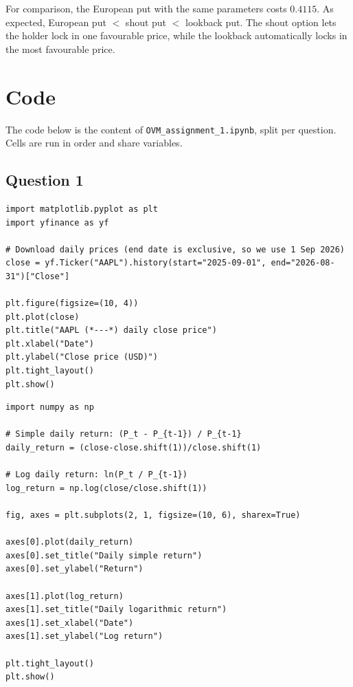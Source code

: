 \documentclass[11pt,a4paper]{article}
\begin{document}
For comparison, the European put with the same parameters costs $0.4115$. As expected,
European put $<$ shout put $<$ lookback put. The shout option lets the holder lock in one
favourable price, while the lookback automatically locks in the most favourable price.

\appendix
\section{Code}
\label{app:code}

The code below is the content of \texttt{OVM\_assignment\_1.ipynb}, split per question.
Cells are run in order and share variables.

\subsection{Question 1}

\begin{lstlisting}[caption={Q1a: download and plot the daily close prices.}, label={lst:q1a-price}]
import matplotlib.pyplot as plt
import yfinance as yf

# Download daily prices (end date is exclusive, so we use 1 Sep 2026)
close = yf.Ticker("AAPL").history(start="2025-09-01", end="2026-08-31")["Close"]

plt.figure(figsize=(10, 4))
plt.plot(close)
plt.title("AAPL (*---*) daily close price")
plt.xlabel("Date")
plt.ylabel("Close price (USD)")
plt.tight_layout()
plt.show()
\end{lstlisting}

\begin{lstlisting}[caption={Q1a: daily simple and logarithmic returns.}, label={lst:q1a-returns}]
import numpy as np

# Simple daily return: (P_t - P_{t-1}) / P_{t-1}
daily_return = (close-close.shift(1))/close.shift(1)

# Log daily return: ln(P_t / P_{t-1})
log_return = np.log(close/close.shift(1))

fig, axes = plt.subplots(2, 1, figsize=(10, 6), sharex=True)

axes[0].plot(daily_return)
axes[0].set_title("Daily simple return")
axes[0].set_ylabel("Return")

axes[1].plot(log_return)
axes[1].set_title("Daily logarithmic return")
axes[1].set_xlabel("Date")
axes[1].set_ylabel("Log return")

plt.tight_layout()
plt.show()
\end{lstlisting}
\end{document}
